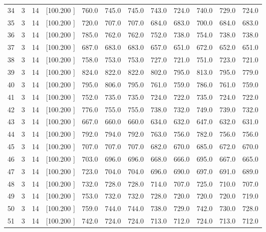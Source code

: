 \documentclass[12pt,a4paper]{article}
\begin{document}
\begin{center}
{\begin{tabular}{r r r r r r r r r r r r}
  34&  3& 14&[100.200   ]&   760.0&   745.0&   745.0&   743.0&   724.0&   740.0&   729.0&   724.0\\[-0.02in]
  35&  3& 14&[100.200   ]&   720.0&   707.0&   707.0&   684.0&   683.0&   700.0&   684.0&   683.0\\[-0.02in]
  36&  3& 14&[100.200   ]&   785.0&   762.0&   762.0&   752.0&   738.0&   754.0&   738.0&   738.0\\[-0.02in]
  37&  3& 14&[100.200   ]&   687.0&   683.0&   683.0&   657.0&   651.0&   672.0&   652.0&   651.0\\[-0.02in]
  38&  3& 14&[100.200   ]&   758.0&   753.0&   753.0&   727.0&   721.0&   751.0&   723.0&   721.0\\[-0.02in]
  39&  3& 14&[100.200   ]&   824.0&   822.0&   822.0&   802.0&   795.0&   813.0&   795.0&   779.0\\[-0.02in]
  40&  3& 14&[100.200   ]&   795.0&   806.0&   795.0&   761.0&   759.0&   786.0&   761.0&   759.0\\[-0.02in]
  41&  3& 14&[100.200   ]&   752.0&   735.0&   735.0&   724.0&   722.0&   735.0&   724.0&   722.0\\[-0.02in]
  42&  3& 14&[100.200   ]&   776.0&   755.0&   755.0&   738.0&   732.0&   749.0&   739.0&   732.0\\[-0.02in]
  43&  3& 14&[100.200   ]&   667.0&   660.0&   660.0&   634.0&   632.0&   647.0&   632.0&   631.0\\[-0.02in]
  44&  3& 14&[100.200   ]&   792.0&   794.0&   792.0&   763.0&   756.0&   782.0&   756.0&   756.0\\[-0.02in]
  45&  3& 14&[100.200   ]&   707.0&   707.0&   707.0&   682.0&   670.0&   685.0&   672.0&   670.0\\[-0.02in]
  46&  3& 14&[100.200   ]&   703.0&   696.0&   696.0&   668.0&   666.0&   695.0&   667.0&   665.0\\[-0.02in]
  47&  3& 14&[100.200   ]&   723.0&   704.0&   704.0&   696.0&   690.0&   697.0&   691.0&   689.0\\[-0.02in]
  48&  3& 14&[100.200   ]&   732.0&   728.0&   728.0&   714.0&   707.0&   725.0&   710.0&   707.0\\[-0.02in]
  49&  3& 14&[100.200   ]&   753.0&   732.0&   732.0&   728.0&   720.0&   720.0&   720.0&   719.0\\[-0.02in]
  50&  3& 14&[100.200   ]&   759.0&   744.0&   744.0&   738.0&   729.0&   742.0&   730.0&   728.0\\[-0.02in]
  51&  3& 14&[100.200   ]&   742.0&   724.0&   724.0&   713.0&   712.0&   724.0&   713.0&   712.0\\[-0.02in]

\end{tabular}}
\end{center}
\end{document}
